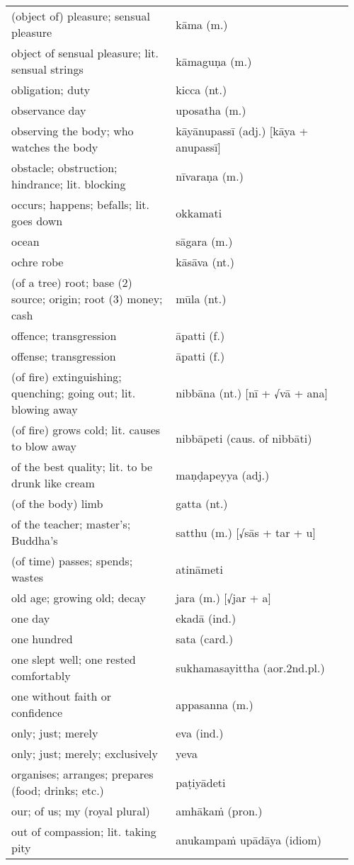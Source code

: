 \documentclass[a5paper]{memoir}
\begin{document}
\begin{longtable}{L{0.48\linewidth} L{0.48\linewidth} H}
(object of) pleasure; sensual pleasure & kāma (m.) & \\
object of sensual pleasure; lit. sensual strings & kāmaguṇa (m.) & \\
obligation; duty & kicca (nt.) & \\
observance day & uposatha (m.) & \\
observing the body; who watches the body & kāyānupassī (adj.) [kāya + anupassī] & \\
obstacle; obstruction; hindrance; lit. blocking & nīvaraṇa (m.) & \\
occurs; happens; befalls; lit. goes down & okkamati & \\
ocean & sāgara (m.) & \\
ochre robe & kāsāva (nt.) & \\
(of a tree) root; base (2) source; origin; root (3) money; cash & mūla (nt.) & \\
offence; transgression & āpatti (f.) & \\
offense; transgression & āpatti (f.) & \\
(of fire) extinguishing; quenching; going out; lit. blowing away & nibbāna (nt.) [nī + √vā + ana] & \\
(of fire) grows cold; lit. causes to blow away & nibbāpeti (caus. of nibbāti) & \\
of the best quality; lit. to be drunk like cream & maṇḍapeyya (adj.) & \\
(of the body) limb & gatta (nt.) & \\
of the teacher; master's; Buddha's & satthu (m.) [√sās + tar + u] & \\
(of time) passes; spends; wastes & atināmeti & \\
old age; growing old; decay & jara (m.) [√jar + a] & \\
one day & ekadā (ind.) & \\
one hundred & sata (card.) & \\
one slept well; one rested comfortably & sukhamasayittha (aor.2nd.pl.) & \\
one without faith or confidence & appasanna (m.) & \\
only; just; merely & eva (ind.) & \\
only; just; merely; exclusively & yeva & \\
organises; arranges; prepares (food; drinks; etc.) & paṭiyādeti & \\
our; of us; my (royal plural) & amhākaṁ (pron.) & \\
out of compassion; lit. taking pity & anukampaṁ upādāya (idiom) & \\

\end{longtable}
\end{document}
